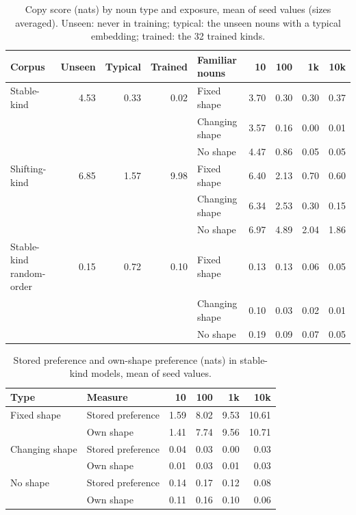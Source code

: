 \begin{table}[!htbp]
\centering\small
\caption{Copy score (nats) by noun type and exposure, mean of seed values (sizes averaged). Unseen: never in training; typical: the unseen nouns with a typical embedding; trained: the 32 trained kinds.}
\label{tab:M2}
\begin{tabular}{@{}lrrrlrrrr@{}}
\toprule
Corpus & Unseen & Typical & Trained & Familiar nouns & 10 & 100 & 1k & 10k \\
\midrule
Stable-kind & 4.53 & \textminus{}0.33 & \textminus{}0.02 & Fixed shape & 3.70 & 0.30 & \textminus{}0.30 & \textminus{}0.37 \\
 & & & & Changing shape & 3.57 & 0.16 & 0.00 & \textminus{}0.01 \\
 & & & & No shape & 4.47 & 0.86 & 0.05 & \textminus{}0.05 \\
\addlinespace
Shifting-kind & 6.85 & 1.57 & 9.98 & Fixed shape & 6.40 & 2.13 & 0.70 & 0.60 \\
 & & & & Changing shape & 6.34 & 2.53 & 0.30 & 0.15 \\
 & & & & No shape & 6.97 & 4.89 & 2.04 & 1.86 \\
\addlinespace
Stable-kind random-order & \textminus{}0.15 & \textminus{}0.72 & \textminus{}0.10 & Fixed shape & \textminus{}0.13 & \textminus{}0.13 & \textminus{}0.06 & \textminus{}0.05 \\
 & & & & Changing shape & \textminus{}0.10 & \textminus{}0.03 & \textminus{}0.02 & \textminus{}0.01 \\
 & & & & No shape & \textminus{}0.19 & \textminus{}0.09 & \textminus{}0.07 & \textminus{}0.05 \\
\bottomrule
\end{tabular}
\end{table}

\begin{table}[!htbp]
\centering\small
\caption{Stored preference and own-shape preference (nats) in stable-kind models, mean of seed values.}
\label{tab:M3}
\begin{tabular}{@{}llrrrr@{}}
\toprule
Type & Measure & 10 & 100 & 1k & 10k \\
\midrule
Fixed shape & Stored preference & 1.59 & 8.02 & 9.53 & 10.61 \\
 & Own shape & 1.41 & 7.74 & 9.56 & 10.71 \\
Changing shape & Stored preference & 0.04 & \textminus{}0.03 & 0.00 & 0.03 \\
 & Own shape & 0.01 & \textminus{}0.03 & \textminus{}0.01 & 0.03 \\
No shape & Stored preference & \textminus{}0.14 & \textminus{}0.17 & 0.12 & 0.08 \\
 & Own shape & 0.11 & \textminus{}0.16 & 0.10 & 0.06 \\
\bottomrule
\end{tabular}
\end{table}

